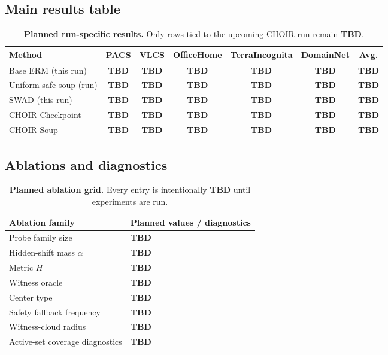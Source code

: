 \documentclass{article}
\newcommand{\TBD}{\textbf{TBD}}
\newcommand{\choir}{\textup{\textsc{CHOIR}}}
\newcommand{\swad}{\textup{\textsc{SWAD}}}
\newcommand{\erm}{\textup{\textsc{ERM}}}
\begin{document}
\subsection{Main results table}

\begin{table}[t]
    \centering
    \caption{\textbf{Planned run-specific results.} Only rows tied to the upcoming \choir{} run remain \TBD{}.}
    \label{tab:main_results}
    \scriptsize
    \begin{adjustbox}{width=\linewidth,center}
    \begin{tabular}{lcccccc}
        \toprule
        Method & PACS & VLCS & OfficeHome & TerraIncognita & DomainNet & Avg. \\
        \midrule
        Base \erm{} (this run) & \TBD{} & \TBD{} & \TBD{} & \TBD{} & \TBD{} & \TBD{} \\
        Uniform safe soup (run) & \TBD{} & \TBD{} & \TBD{} & \TBD{} & \TBD{} & \TBD{} \\
        \swad{} (this run) & \TBD{} & \TBD{} & \TBD{} & \TBD{} & \TBD{} & \TBD{} \\
        \choir{}-Checkpoint & \TBD{} & \TBD{} & \TBD{} & \TBD{} & \TBD{} & \TBD{} \\
        \choir{}-Soup & \TBD{} & \TBD{} & \TBD{} & \TBD{} & \TBD{} & \TBD{} \\
        \bottomrule
    \end{tabular}
    \end{adjustbox}
\end{table}

\subsection{Ablations and diagnostics}

\begin{table}[t]
    \centering
    \caption{\textbf{Planned ablation grid.} Every entry is intentionally \TBD{} until experiments are run.}
    \label{tab:ablations}
    \begin{tabular}{ll}
        \toprule
        Ablation family & Planned values / diagnostics \\
        \midrule
        Probe family size & \TBD{} \\
        Hidden-shift mass \(\alpha\) & \TBD{} \\
        Metric \(H\) & \TBD{} \\
        Witness oracle & \TBD{} \\
        Center type & \TBD{} \\
        Safety fallback frequency & \TBD{} \\
        Witness-cloud radius & \TBD{} \\
        Active-set coverage diagnostics & \TBD{} \\
        \bottomrule
    \end{tabular}
\end{table}
\end{document}
